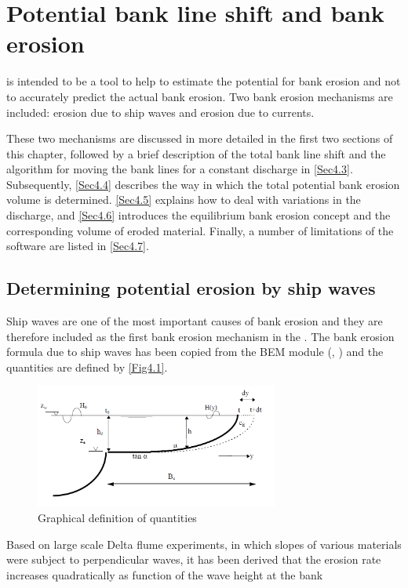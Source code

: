 \chapter{Potential bank line shift and bank erosion} \label{Chp4}

\dfastbe is intended to be a tool to help to estimate the potential for bank erosion and not to accurately predict the actual bank erosion.
Two bank erosion mechanisms are included: erosion due to ship waves and erosion due to currents.

These two mechanisms are discussed in more detailed in the first two sections of this chapter, followed by a brief description of the total bank line shift and the algorithm for moving the bank lines for a constant discharge in \autoref{Sec4.3}.
Subsequently, \autoref{Sec4.4} describes the way in which the total potential bank erosion volume is determined.
\autoref{Sec4.5} explains how to deal with variations in the discharge, and \autoref{Sec4.6} introduces the equilibrium bank erosion concept and the corresponding volume of eroded material.
Finally, a number of limitations of the software are listed in \autoref{Sec4.7}.

\section{Determining potential erosion by ship waves} \label{Sec4.1}

Ship waves are one of the most important causes of bank erosion \citep{Verheij00} and they are therefore included as the first bank erosion mechanism in the \dfastbe.
The bank erosion formula due to ship waves has been copied from the BEM module (\citet{Verheij00}, \citet{StolkerV01b}) and the quantities are defined by \autoref{Fig4.1}.

\begin{figure}
\center
\includegraphics[width=8cm]{figures/Fig4-1.png}
\caption{Graphical definition of quantities}
\label{Fig4.1}
\end{figure}

Based on large scale Delta flume experiments, in which slopes of various materials were subject to perpendicular waves, it has been derived that the erosion rate increases quadratically as function of the wave height at the bank

